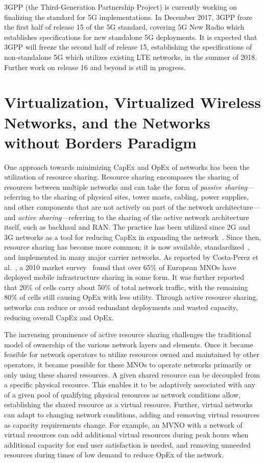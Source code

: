 \documentclass[12pt,dvipsnames]{report}
\begin{document}
3GPP (the Third-Generation Partnership Project) is currently working on finalizing the standard for 5G implementations.  In December 2017, 3GPP froze the first half of release 15 of the 5G standard, covering 5G New Radio which establishes specifications for new standalone 5G deployments.  It is expected that 3GPP will freeze the second half of release 15, establishing the specifications of non-standalone 5G which utilizes existing LTE networks, in the summer of 2018.  Further work on release 16 and beyond is still in progress.

\section{Virtualization, Virtualized Wireless Networks, and the Networks without Borders Paradigm} \label{sec:virtualization}

One approach towards minimizing CapEx and OpEx of networks has been the utilization of resource sharing.  Resource sharing encompases the sharing of resources between multiple networks and can take the form of \emph{passive sharing}---referring to the sharing of physical sites, tower masts, cabling, power supplies, and other components that are not actively on part of the network architecture---and \emph{active sharing}---referring to the sharing of the active network architecture itself, such as backhaul and RAN.  The practice has been utilized since 2G and 3G networks as a tool for reducing CapEx in expanding the network~\cite{1421931}.  Since then, resource sharing has become more common; it is now available, standardized~\cite{3GPP_TS_23.251}, and implemented in many major carrier networks.  As reported by Costa-Perez et al.~\cite{6553675}, a 2010 market survey~\cite{NetSharingReport} found that over 65\% of European MNOs have deployed mobile infrastructure sharing in some form.  It was further reported~\cite{6553675} that 20\% of cells carry about 50\% of total network traffic, with the remaining 80\% of cells still causing OpEx with less utility.  Through active resource sharing, networks can reduce or avoid redundant deployments and wasted capacity, reducing overall CapEx and OpEx.

The increasing prominence of active resource sharing challenges the traditional model of ownership of the various network layers and elements.  Once it became feasible for network operators to utilize resources owned and maintained by other operators, it became possible for these MNOs to operate networks primarily or only using these shared resources.  A given shared resource can be decoupled from a specific physical resource.  This enables it to be adaptively associated with any of a given pool of qualifying physical resources as network conditions allow, establishing the shared resource as a virtual resource.  Further, virtual networks can adapt to changing network conditions, adding and removing virtual resources as capacity requirements change.  For example, an MVNO with a network of virtual resources can add additional virtual resources during peak hours when additional capacity for end user satisfaction is needed, and removing unneeded resources during times of low demand to reduce OpEx of the network.
\end{document}
